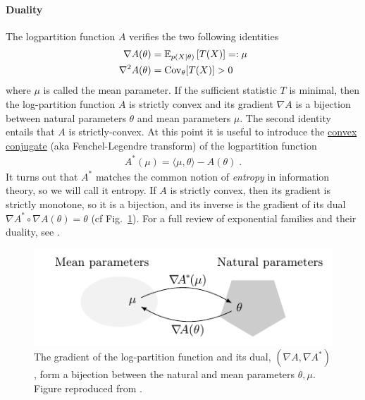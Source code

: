 \documentclass{article}
\newcommand*{\expect}[2][]{\ensuremath{\mathbb{E}_{#1} \left[ #2 \right] }} %
\newcommand{\logpart}{A}
\newcommand{\conj}{\logpart^*}
\newcommand{\natp}{\theta}
\newcommand{\meanp}{\mu}
\begin{document}
\paragraph{Duality}
The logpartition function $\logpart$ verifies the two following identities
\begin{align}
    \nabla\logpart(\natp) &=  \expect[p(X|\natp)]{T(X)} =: \meanp \\
    \nabla^2 \logpart(\natp) &= \Cov_\natp[T(X)] > 0
\end{align}
where $\meanp$ is called the mean parameter.
If the sufficient statistic $T$ is minimal, then the log-partition function $\logpart$ is strictly convex and its gradient $\nabla \logpart$ is a bijection between natural parameters $\natp$ and mean parameters $\mu$.
The second identity entails that $\logpart$ is strictly-convex. 
At this point it is useful to introduce the \href{https://en.wikipedia.org/wiki/Convex_conjugate}{convex conjugate} (aka Fenchel-Legendre transform) of the logpartition function
\begin{align}
	\conj(\mu) = \langle \mu, \natp \rangle - \logpart(\natp) \; .
\end{align}
It turns out that $\conj$ matches the common notion of \textit{entropy} in information theory, so we will call it entropy.
If $\logpart$ is strictly convex, then its gradient is strictly monotone, so it is a bijection, and its inverse is the gradient of its dual $\nabla\conj \circ \nabla\logpart(\natp) = \natp$ (cf Fig.~\ref{fig:duality}).
For a full review of exponential families and their duality, see \citet[Chapter 3]{wainwright2008graphical}.
\begin{figure}[ht]
	\centering
	\includegraphics{figs/duality}
	\caption{The gradient of the log-partition function and its dual, $(\nabla \logpart, \nabla \conj)$, form a bijection between the natural and mean parameters $\natp, \meanp$. Figure reproduced from \citet{kunstner2020homeomorphic}.}
	\label{fig:duality}
\end{figure}
\end{document}
